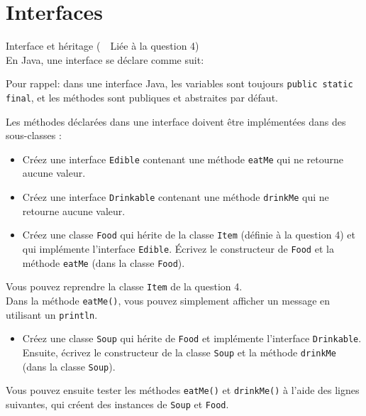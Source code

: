 \section{Interfaces}
\begin{Exercice}[15 minutes]{Interface et héritage (\faLink~~Liée à la question 4)}\\

En Java, une interface se déclare comme suit:
 

Pour rappel: dans une interface Java, les variables sont toujours \lstinline{public static final}, et les méthodes sont publiques et abstraites par défaut.

Les méthodes déclarées dans une interface doivent être implémentées dans des sous-classes :

 
\begin{itemize}
	\item Créez une interface \lstinline{Edible} contenant une méthode \lstinline{eatMe} qui ne retourne aucune valeur.
	\item Créez une interface \lstinline{Drinkable} contenant une méthode \lstinline{drinkMe} qui ne retourne aucune valeur.
	\item Créez une classe \lstinline{Food} qui hérite de la classe \lstinline{Item} (définie à la question 4) et qui implémente l'interface \lstinline{Edible}. Écrivez le constructeur de \lstinline{Food} et la méthode \lstinline{eatMe} (dans la classe \lstinline{Food}).
\end{itemize}

\begin{conseil}
Vous pouvez reprendre la classe \lstinline{Item} de la question 4.\\
Dans la méthode \lstinline{eatMe()}, vous pouvez simplement afficher un message en utilisant un \lstinline{println}.
\end{conseil}

\begin{itemize}
	\item Créez une classe \lstinline{Soup} qui hérite de \lstinline{Food} et implémente l'interface \lstinline{Drinkable}. Ensuite, écrivez le constructeur de la classe \lstinline{Soup} et la méthode \lstinline{drinkMe} (dans la classe \lstinline{Soup}).
\end{itemize}

Vous pouvez ensuite tester les méthodes \lstinline{eatMe()} et \lstinline{drinkMe()} à l'aide des lignes suivantes, qui créent des instances de \lstinline{Soup} et \lstinline{Food}.
 


\end{Exercice}
